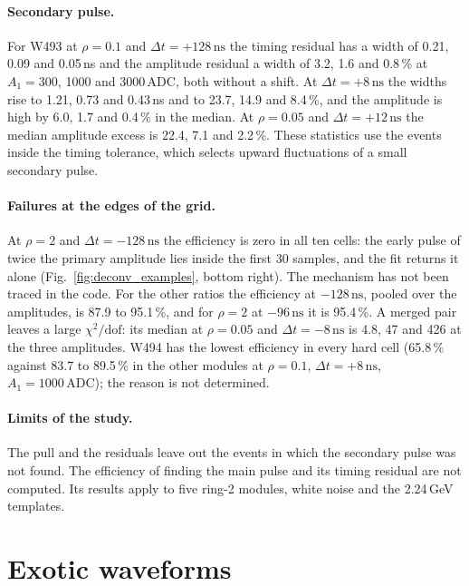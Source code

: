 \documentclass[11pt]{article}
\newcommand{\ns}{\,\mathrm{ns}}
\newcommand{\adc}{\,\mathrm{ADC}}
\begin{document}
\paragraph{Secondary pulse.} For W493 at $\rho = 0.1$ and $\Delta t = +128\ns$ the timing residual has a width of 0.21, 0.09 and 0.05\,ns and the amplitude residual a width of 3.2, 1.6 and 0.8\,\% at $A_1 = 300$, 1000 and 3000\,ADC, both without a shift. At $\Delta t = +8\ns$ the widths rise to 1.21, 0.73 and 0.43\,ns and to 23.7, 14.9 and 8.4\,\%, and the amplitude is high by 6.0, 1.7 and 0.4\,\% in the median. At $\rho = 0.05$ and $\Delta t = +12\ns$ the median amplitude excess is 22.4, 7.1 and 2.2\,\%. These statistics use the events inside the timing tolerance, which selects upward fluctuations of a small secondary pulse.

\paragraph{Failures at the edges of the grid.} At $\rho = 2$ and $\Delta t = -128\ns$ the efficiency is zero in all ten cells: the early pulse of twice the primary amplitude lies inside the first 30 samples, and the fit returns it alone (Fig.~\ref{fig:deconv_examples}, bottom right). The mechanism has not been traced in the code. For the other ratios the efficiency at $-128\ns$, pooled over the amplitudes, is 87.9 to 95.1\,\%, and for $\rho = 2$ at $-96\ns$ it is 95.4\,\%. A merged pair leaves a large $\chi^2/\mathrm{dof}$: its median at $\rho = 0.05$ and $\Delta t = -8\ns$ is 4.8, 47 and 426 at the three amplitudes. W494 has the lowest efficiency in every hard cell (65.8\,\% against 83.7 to 89.5\,\% in the other modules at $\rho = 0.1$, $\Delta t = +8\ns$, $A_1 = 1000\adc$); the reason is not determined.

\paragraph{Limits of the study.} The pull and the residuals leave out the events in which the secondary pulse was not found. The efficiency of finding the main pulse and its timing residual are not computed. Its results apply to five ring-2 modules, white noise and the 2.24\,GeV templates.
\clearpage

\section{Exotic waveforms}
\label{sec:exotic}
\end{document}
